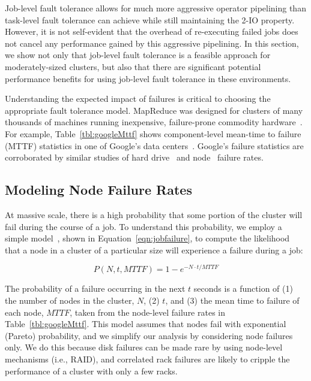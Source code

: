 Job-level fault tolerance allows for much more aggressive operator pipelining
than task-level fault tolerance can achieve while still maintaining the 2-IO
property.  However, it is not self-evident that the overhead of re-executing
failed jobs does not cancel any performance gained by this aggressive
pipelining.  In this section, we show not only that job-level fault tolerance
is a feasible approach for moderately-sized clusters, but also that there are
significant potential performance benefits for using job-level fault tolerance
in these environments.

Understanding the expected impact of failures is critical to choosing the
appropriate fault tolerance model.  MapReduce was designed for clusters of many
thousands of machines running inexpensive, failure-prone commodity
hardware~\cite{mapreduce}.  For example, Table~\ref{tbl:googleMttf} shows
component-level mean-time to failure (MTTF) statistics in one of Google's data
centers~\cite{google-availability:osdi10}. Google's failure statistics are
corroborated by similar studies of hard
drive~\cite{DBLP:conf/fast/PinheiroWB07,Schroeder:2007:UDF:1288783.1288785} and
node~\cite{DBLP:conf/nsdi/NathYGS06, Schroeder:2010:LSF:1916484.1916652}
failure rates.

\subsection{Modeling Node Failure Rates}

At massive scale, there is a high probability that some portion of the cluster
will fail during the course of a job.  To understand this probability, we
employ a simple model~\cite{sysreliability}, shown in
Equation~\ref{eqn:jobfailure}, to compute the likelihood that a node in a
cluster of a particular size will experience a failure during a job:

\begin{equation}
P(N, t, MTTF) = 1 - e^{-N \cdot t / MTTF}
\label{eqn:jobfailure}
\end{equation}

The probability of a failure occurring in the next $t$ seconds is
a function of (1) the number of nodes in the cluster, $N$, (2) $t$, and (3) the
mean time to failure of each node, $MTTF$, taken from the node-level failure
rates in Table~\ref{tbl:googleMttf}.  This model assumes that nodes fail with
exponential (Pareto) probability, and we simplify our analysis by considering
node failures only.  We do this because disk failures can be made rare by using
node-level mechanisms (i.e., RAID), and correlated rack failures are likely to
cripple the performance of a cluster with only a few racks.

